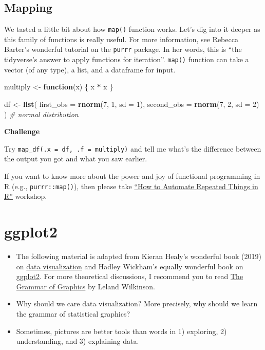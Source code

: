 \documentclass[
]{book}
\newenvironment{Shaded}{\begin{snugshade}}{\end{snugshade}}
\newcommand{\CommentTok}[1]{\textcolor[rgb]{0.56,0.35,0.01}{\textit{#1}}}
\newcommand{\ControlFlowTok}[1]{\textcolor[rgb]{0.13,0.29,0.53}{\textbf{#1}}}
\newcommand{\DataTypeTok}[1]{\textcolor[rgb]{0.13,0.29,0.53}{#1}}
\newcommand{\DecValTok}[1]{\textcolor[rgb]{0.00,0.00,0.81}{#1}}
\newcommand{\KeywordTok}[1]{\textcolor[rgb]{0.13,0.29,0.53}{\textbf{#1}}}
\newcommand{\NormalTok}[1]{#1}
\newcommand{\OperatorTok}[1]{\textcolor[rgb]{0.81,0.36,0.00}{\textbf{#1}}}
\newcommand{\StringTok}[1]{\textcolor[rgb]{0.31,0.60,0.02}{#1}}
\begin{document}
\hypertarget{mapping}{%
\subsection{Mapping}\label{mapping}}

We tasted a little bit about how \texttt{map()} function works. Let's dig into it deeper as this family of functions is really useful. For more information, see Rebecca Barter's wonderful tutorial on the \texttt{purrr} package. In her words, this is ``the tidyverse's answer to apply functions for iteration''. \texttt{map()} function can take a vector (of any type), a list, and a dataframe for input.

\begin{Shaded}
\begin{Highlighting}[]
\NormalTok{multiply \textless{}{-}}\StringTok{ }\ControlFlowTok{function}\NormalTok{(x) \{}
\NormalTok{  x }\OperatorTok{*}\StringTok{ }\NormalTok{x}
\NormalTok{\}}

\NormalTok{df \textless{}{-}}\StringTok{ }\KeywordTok{list}\NormalTok{(}
  \DataTypeTok{first\_obs =} \KeywordTok{rnorm}\NormalTok{(}\DecValTok{7}\NormalTok{, }\DecValTok{1}\NormalTok{, }\DataTypeTok{sd =} \DecValTok{1}\NormalTok{),}
  \DataTypeTok{second\_obs =} \KeywordTok{rnorm}\NormalTok{(}\DecValTok{7}\NormalTok{, }\DecValTok{2}\NormalTok{, }\DataTypeTok{sd =} \DecValTok{2}\NormalTok{)}
\NormalTok{) }\CommentTok{\# normal distribution}
\end{Highlighting}
\end{Shaded}

\textbf{Challenge}

Try \texttt{map\_df(.x\ =\ df,\ .f\ =\ multiply)} and tell me what's the difference between the output you got and what you saw earlier.

If you want to know more about the power and joy of functional programming in R (e.g., \texttt{purrr::map()}), then please take \href{https://github.com/dlab-berkeley/R-functional-programming}{``How to Automate Repeated Things in R''} workshop.

\hypertarget{ggplot2}{%
\section{ggplot2}\label{ggplot2}}

\begin{itemize}
\item
  The following material is adapted from Kieran Healy's wonderful book (2019) on \href{https://socviz.co/}{data visualization} and Hadley Wickham's equally wonderful book on \href{https://link.springer.com/content/pdf/10.1007\%2F978-0-387-98141-3.pdf}{ggplot2}. For more theoretical discussions, I recommend you to read \href{https://link.springer.com/book/10.1007\%2F0-387-28695-0}{The Grammar of Graphics} by Leland Wilkinson.
\item
  Why should we care data visualization? More precisely, why should we learn the grammar of statistical graphics?
\item
  Sometimes, pictures are better tools than words in 1) exploring, 2) understanding, and 3) explaining data.
\end{itemize}
\end{document}
